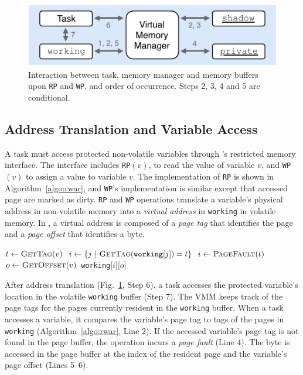 \begin{figure}
    \centering
    \includegraphics[width=0.8\columnwidth]{figures/mem-man.pdf}
    \caption{Interaction between task, memory manager and memory buffers upon \texttt{RP} and \texttt{WP}, and order of occurrence. Steps 2, 3, 4 and 5 are conditional.}
    \label{figure:mem-man}
\end{figure}

\subsection{Address Translation and Variable Access}

A task must access protected non-volatile variables through \sys's restricted memory interface.
The interface includes \texttt{RP}$(v)$, to read the value of variable $v$, and \texttt{WP}$(v)$ to assign a value to variable $v$.
The implementation of {\tt RP} is shown in Algorithm~\ref{algo:rwar}, and {\tt WP}'s implementation is similar except that accessed page are marked as dirty.
{\tt RP} and {\tt WP} operations translate a variable's physical address in non-volatile memory into a \emph{virtual address} in \texttt{working} in volatile memory.
In \sys, a virtual address is composed of a \emph{page tag} that identifies the page and a \emph{page offset} that identifies a byte.

\begin{algorithm}[t]
    \label{algo:rwar}
    \small
    \begin{algorithmic}[1]
		\State $t \leftarrow \Call{GetTag}{v}$
        \State $i \gets \{ j\ |\ \Call{GetTag}{\texttt{working}[j]} = t \}$ 
		 
		\State	$i \gets \Call{PageFault}{t}$ 
		\EndIf
		\State $o \leftarrow \Call{GetOffset}{v}$
		\State \Return \texttt{working}[$i$][$o$]  
	\end{algorithmic}
\end{algorithm}

After address translation (Fig.~\ref{figure:mem-man}, Step 6), a task accesses the protected variable's location in the volatile \texttt{working} buffer (Step 7). The VMM keeps track of the page tags for the pages currently resident in the \texttt{working} buffer. When a task accesses a variable, it compares the variable's page tag to tags of the pages in {\tt working} (Algorithm~\ref{algo:rwar}, Line 2). If the accessed variable's page tag is not found in the page buffer, the operation incurs a {\em page fault} (Line 4). The byte is accessed in the page buffer at the index of the resident page and the variable's page offset (Lines 5--6).

